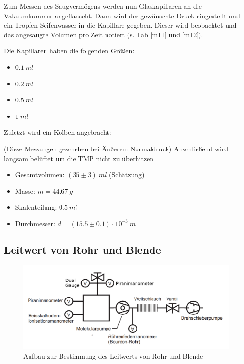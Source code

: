 \documentclass[12pt, a4paper]{scrartcl}
\begin{document}
        Zum Messen des Saugvermögens werden nun Glaskapillaren an die Vakuumkammer angeflanscht. Dann wird der gewünschte Druck eingestellt und ein Tropfen Seifenwasser in die Kapillare gegeben. Dieser wird beobachtet und das angesaugte Volumen pro Zeit notiert (s. Tab \ref{m11} und \ref{m12}).
    	
    	Die Kapillaren haben die folgenden Größen:
        \begin{itemize}
            \item $0.1\ ml$
            \item $0.2\ ml$
            \item $0.5\ ml$
            \item $1\ ml$
        \end{itemize}
    	
    	
    	Zuletzt wird ein Kolben angebracht:
        
        
        (Diese Messungen geschehen bei Äußerem Normaldruck)
        Anschließend wird langsam belüftet um die TMP nicht zu überhitzen
    	
    	\begin{itemize}
    		\item Gesamtvolumen: $(35\pm3)\ ml$ (Schätzung)
    		\item Masse: $m=44.67\ g$
    		\item Skalenteilung: $0.5\ ml$
    		\item Durchmesser: $d=(15.5\pm0.1)\cdot10^{-3}\ m$
    	\end{itemize}
    
    \subsection{Leitwert von Rohr und Blende}
    
        \begin{figure}[H]
            \centering
            \includegraphics[width=.55\paperwidth]{aufbau24.png}
            \caption{Aufbau zur Bestimmung des Leitwerts von Rohr und Blende}
            \label{fig:anord5}
        \end{figure}
    
\end{document}
